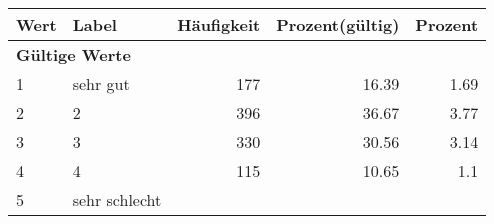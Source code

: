      \begin{longtable}{lXrrr}
     \toprule
     \textbf{Wert} & \textbf{Label} & \textbf{Häufigkeit} & \textbf{Prozent(gültig)} & \textbf{Prozent} \\
     \endhead
     \midrule
     \multicolumn{5}{l}{\textbf{Gültige Werte}}\\

     1 &
     \multicolumn{1}{X}{ sehr gut   } &


       \num{177} &
       \num[round-mode=places,round-precision=2]{16.39} &
         \num[round-mode=places,round-precision=2]{1.69} \\

     2 &
     \multicolumn{1}{X}{ 2   } &


       \num{396} &
       \num[round-mode=places,round-precision=2]{36.67} &
         \num[round-mode=places,round-precision=2]{3.77} \\

     3 &
     \multicolumn{1}{X}{ 3   } &


       \num{330} &
       \num[round-mode=places,round-precision=2]{30.56} &
         \num[round-mode=places,round-precision=2]{3.14} \\

     4 &
     \multicolumn{1}{X}{ 4   } &


       \num{115} &
       \num[round-mode=places,round-precision=2]{10.65} &
         \num[round-mode=places,round-precision=2]{1.1} \\

     5 &
     \multicolumn{1}{X}{ sehr schlecht   } &



\end{longtable}
